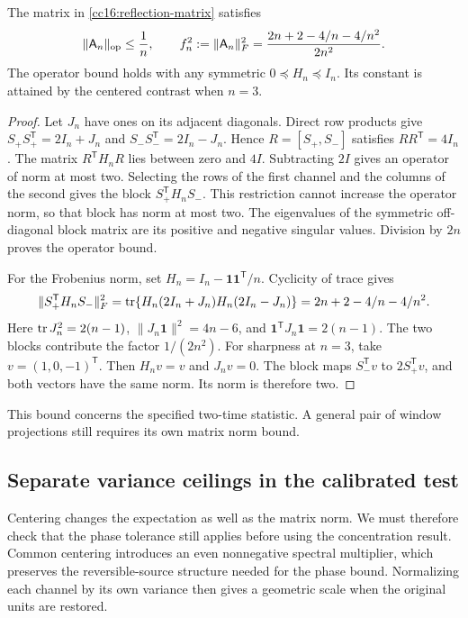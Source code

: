 \begin{lemma}
\label{cc16:matrix-norm}
The matrix in \eqref{cc16:reflection-matrix} satisfies
\begin{equation}
 \|\mathsf A_n\|_{\rm op}\le\frac1n,
 \qquad
 f_n^2:=\|\mathsf A_n\|_F^2
 =\frac{2n+2-4/n-4/n^2}{2n^2}.
 \label{cc16:norms}
\end{equation}
The operator bound holds with any symmetric $0\preceq H_n\preceq I_n$. Its constant is attained by the centered contrast when $n=3$.
\end{lemma}
\begin{proof}
Let $J_n$ have ones on its adjacent diagonals. Direct row products give $S_+S_+^{\mathsf T}=2I_n+J_n$ and $S_-S_-^{\mathsf T}=2I_n-J_n$. Hence $R=[S_+,S_-]$ satisfies $RR^{\mathsf T}=4I_n$. The matrix $R^{\mathsf T}H_nR$ lies between zero and $4I$. Subtracting $2I$ gives an operator of norm at most two. Selecting the rows of the first channel and the columns of the second gives the block $S_+^{\mathsf T}H_nS_-$. This restriction cannot increase the operator norm, so that block has norm at most two. The eigenvalues of the symmetric off-diagonal block matrix are its positive and negative singular values. Division by $2n$ proves the operator bound.

For the Frobenius norm, set $H_n=I_n-\mathbf1\mathbf1^{\mathsf T}/n$. Cyclicity of trace gives
\[
 \|S_+^{\mathsf T}H_nS_-\|_F^2
 =\operatorname{tr}\{H_n(2I_n+J_n)H_n(2I_n-J_n)\}
 =2n+2-4/n-4/n^2.
\]
Here $\operatorname{tr} J_n^2=2(n-1)$, $\|J_n\mathbf1\|^2=4n-6$, and $\mathbf1^{\mathsf T}J_n\mathbf1=2(n-1)$. The two blocks contribute the factor $1/(2n^2)$. For sharpness at $n=3$, take $v=(1,0,-1)^{\mathsf T}$. Then $H_nv=v$ and $J_nv=0$. The block maps $S_-^{\mathsf T}v$ to $2S_+^{\mathsf T}v$, and both vectors have the same norm. Its norm is therefore two.
\end{proof}

This bound concerns the specified two-time statistic. A general pair of window projections still requires its own matrix norm bound.

\subsection{Separate variance ceilings in the calibrated test}

Centering changes the expectation as well as the matrix norm. We must therefore check that the phase tolerance still applies before using the concentration result. Common centering introduces an even nonnegative spectral multiplier, which preserves the reversible-source structure needed for the phase bound. Normalizing each channel by its own variance then gives a geometric scale when the original units are restored.


